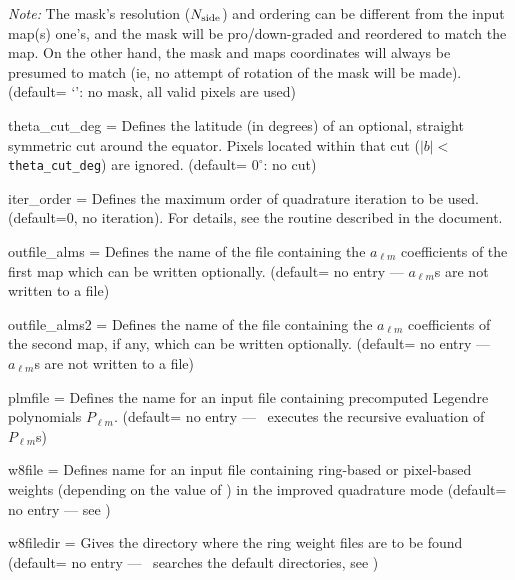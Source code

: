 \begin{qualifiers}
\begin{qulist}{}
{\em Note:} The mask's resolution ($N_{\mathrm{side}}$) and ordering can be different from the input map(s)
one's, and the mask will be pro/down-graded and reordered to match the map. On the
other hand, the mask and maps coordinates will always be presumed to match (ie, no
attempt of rotation of the mask will be made).
(default= `': no mask, all valid pixels are used)
 \item[{theta\_cut\_deg = }]%
 Defines the latitude (in degrees) of 
an optional, straight symmetric cut around the equator.  Pixels located within
that cut ($|b|<${\tt theta\_cut\_deg}) are ignored.
(default= $0^\circ$: no cut)
 \item[{iter\_order = }]%
 Defines the maximum order of quadrature 
iteration to be used. (default=0, no iteration).
For details, see the  routine
described in the  document.
 \item[{outfile\_alms = }]%
 Defines the name of the file 
containing the $a_{\ell m}$  coefficients of the first map
which can be written optionally.   (default= no entry ---
$a_{\ell m}$s are not written to a file)
 \item[{outfile\_alms2 = }]%
 Defines the name of the file 
containing the $a_{\ell m}$  coefficients of the second map, if any,
which can be written optionally.   (default= no entry ---
$a_{\ell m}$s are not written to a file)
 \item[{plmfile = }]%
 Defines the name for an input file
    containing  precomputed Legendre polynomials $P_{\ell m}$.
(default= no entry --- \thedocid\ executes the recursive evaluation 
of $P_{\ell m}$s)
\item[{w8file = }]%
 Defines name for an input file containing ring-based or pixel-based
  weights (depending on the value of ) in the improved quadrature mode (default= no entry ---
see )
\item[{w8filedir = }]%
 Gives the directory where the ring weight files are
to be found (default= no entry --- \thedocid\ searches the default
directories, see )

\end{qulist}
\end{qualifiers}
